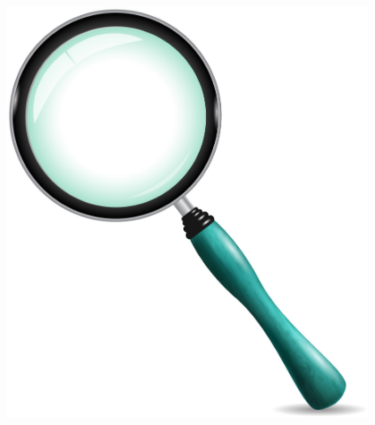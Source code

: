 \begin{frame}
\begin{columns}
        \begin{column}{0.3\textwidth}
            \begin{figure}[!ht]
                \includegraphics[width=0.95\textwidth]{figures/stase/glass.jpg}
            \end{figure}
        \end{column}
    \end{columns}

\end{frame}

